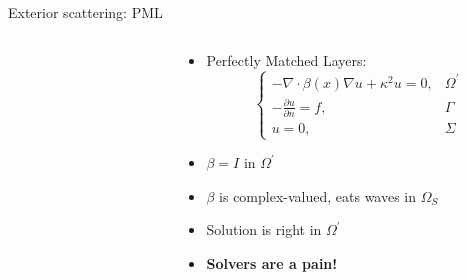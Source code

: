 \documentclass{beamer}
\begin{document}
\begin{frame}{Exterior scattering: PML}
    \begin{columns}
    \begin{column}{0.45\textwidth}
        \begin{figure}[ht]
        \begin{center}
        \end{center}
        \end{figure}
    \end{column}
    \begin{column}{0.55\textwidth}
        \begin{itemize}
            \item Perfectly Matched Layers:
            \[
                \begin{cases}
                    -\nabla \cdot \beta(x) \nabla u + \kappa^2 u = 0,  & \Omega^\prime \\
                    -\frac{\partial u}{\partial n}  =  f, &\Gamma \\
                    u = 0, &\Sigma
                \end{cases}
            \]
              \item<2-> $\beta = I$ in $\Omega^\prime$
              \item<3-> $\beta$ is complex-valued, eats waves in $\Omega_S$
              \item<4-> Solution is right in $\Omega^\prime$
              \item<5-> {\bf Solvers are a pain!}
        \end{itemize}
    \end{column}
    \end{columns}
\end{frame}

\end{document}
